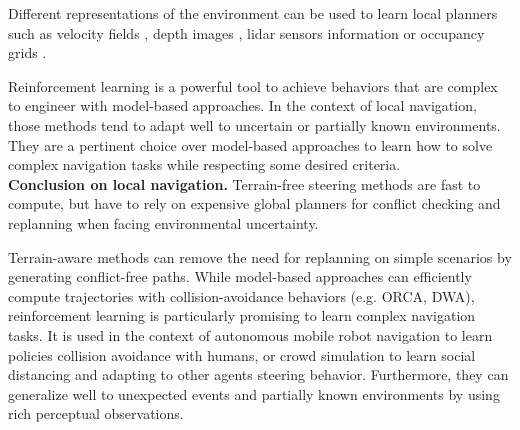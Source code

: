 Different representations of the environment can be used to learn local planners such as velocity fields \cite{deep_multiagent_crowd_2020}, depth images \cite{learn_steer_2018}, lidar sensors information \cite{prm_rl_2019, RL_RRT} or occupancy grids \cite{rl_navigation_video_game_2020}.

Reinforcement learning is a powerful tool to achieve behaviors that are complex to engineer with model-based approaches.
In the context of local navigation, those methods tend to adapt well to uncertain or partially known environments.
They are a pertinent choice over model-based approaches to learn how to solve complex navigation tasks while respecting some desired criteria.\\


\noindent\textbf{Conclusion on local navigation.}
Terrain-free steering methods are fast to compute, but have to rely on expensive global planners for conflict checking and replanning when facing environmental uncertainty.

Terrain-aware methods can remove the need for replanning on simple scenarios by generating conflict-free paths. %
While model-based approaches can efficiently compute trajectories with collision-avoidance behaviors (e.g. ORCA, DWA), reinforcement learning is particularly promising to learn complex navigation tasks.
It is used in the context of autonomous mobile robot navigation to learn policies collision avoidance with humans, or crowd simulation to learn social distancing and adapting to other agents steering behavior. 
Furthermore, they can generalize well to unexpected events and partially known environments by using rich perceptual observations.




